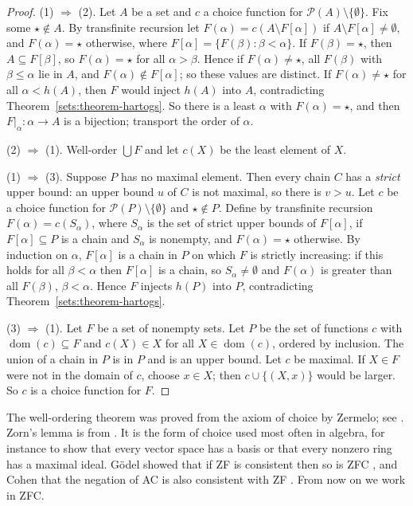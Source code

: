\begin{proof}
(1) $\Rightarrow$ (2). Let $A$ be a set and $c$ a choice function for
$\mathcal{P}(A) \setminus \{\emptyset\}$. Fix some $\star \notin A$. By transfinite
recursion let $F(\alpha) = c(A \setminus F[\alpha])$ if
$A \setminus F[\alpha] \neq \emptyset$, and $F(\alpha) = \star$ otherwise, where
$F[\alpha] = \{F(\beta) : \beta < \alpha\}$. If $F(\beta) = \star$, then
$A \subseteq F[\beta]$, so $F(\alpha) = \star$ for all $\alpha > \beta$. Hence if
$F(\alpha) \neq \star$, all $F(\beta)$ with $\beta \leq \alpha$ lie in $A$, and
$F(\alpha) \notin F[\alpha]$; so these values are distinct. If $F(\alpha) \neq \star$ for all $\alpha < h(A)$, then $F$
would inject $h(A)$ into $A$, contradicting Theorem~\ref{sets:theorem-hartogs}.
So there is a least $\alpha$ with $F(\alpha) = \star$, and then
$F|_\alpha \colon \alpha \to A$ is a bijection; transport the order of $\alpha$.

(2) $\Rightarrow$ (1). Well-order $\bigcup F$ and let $c(X)$ be the least element
of $X$.

(1) $\Rightarrow$ (3). Suppose $P$ has no maximal element. Then every chain $C$
has a \emph{strict} upper bound: an upper bound $u$ of $C$ is not maximal, so
there is $v > u$. Let $c$ be a choice function for
$\mathcal{P}(P) \setminus \{\emptyset\}$ and $\star \notin P$. Define by transfinite
recursion $F(\alpha) = c(S_\alpha)$, where $S_\alpha$ is the set of strict upper
bounds of $F[\alpha]$, if $F[\alpha] \subseteq P$ is a chain and $S_\alpha$ is
nonempty, and $F(\alpha) = \star$ otherwise. By induction on $\alpha$,
$F[\alpha]$ is a chain in $P$ on which $F$ is strictly increasing: if this holds
for all $\beta < \alpha$ then $F[\alpha]$ is a chain, so $S_\alpha \neq \emptyset$
and $F(\alpha)$ is greater than all $F(\beta)$, $\beta < \alpha$. Hence $F$
injects $h(P)$ into $P$, contradicting Theorem~\ref{sets:theorem-hartogs}.

(3) $\Rightarrow$ (1). Let $F$ be a set of nonempty sets. Let $P$ be the set of
functions $c$ with $\operatorname{dom}(c) \subseteq F$ and $c(X) \in X$ for all
$X \in \operatorname{dom}(c)$, ordered by inclusion. The union of a chain in $P$
is in $P$ and is an upper bound. Let $c$ be maximal. If $X \in F$ were not in
the domain of $c$, choose $x \in X$; then $c \cup \{(X, x)\}$ would be larger. So
$c$ is a choice function for $F$.
\end{proof}

\begin{remark}\label{sets:remark-choice-history}
The well-ordering theorem was proved from the axiom of choice by Zermelo;
see \cite{zermelo-1908}. Zorn's lemma is from \cite{zorn-1935}. It is the form
of choice used most often in algebra, for instance to show that every vector
space has a basis or that every nonzero ring has a maximal ideal. G\"odel
showed that if ZF is consistent then so is ZFC \cite{godel-1938}, and Cohen
that the negation of AC is also consistent with ZF \cite{cohen-1963}. From now
on we work in ZFC.
\end{remark}

